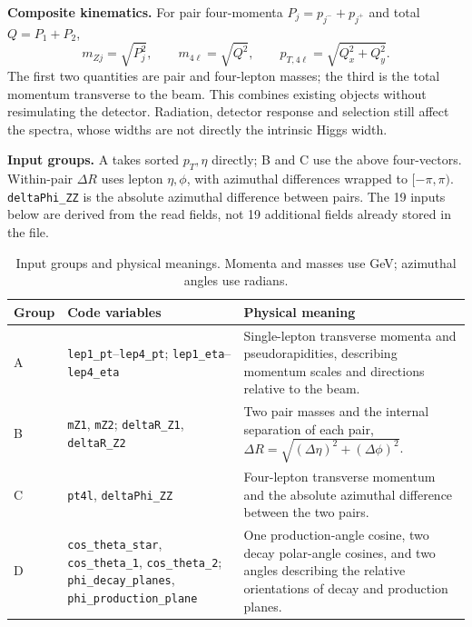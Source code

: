 \documentclass[11pt,a4paper]{article}
\begin{document}
\textbf{Composite kinematics.}
For pair four-momenta $P_j=p_{j^-}+p_{j^+}$ and total $Q=P_1+P_2$,
\[
 m_{Zj}=\sqrt{P_j^2},\qquad m_{4\ell}=\sqrt{Q^2},\qquad
 p_{T,4\ell}=\sqrt{Q_x^2+Q_y^2}.
\]
The first two quantities are pair and four-lepton masses; the third is the total momentum transverse to the beam.
This combines existing objects without resimulating the detector.
Radiation, detector response and selection still affect the spectra, whose widths are not directly the intrinsic Higgs width.

\textbf{Input groups.}
A takes sorted $p_T,\eta$ directly; B and C use the above four-vectors.
Within-pair $\Delta R$ uses lepton $\eta,\phi$, with azimuthal differences wrapped to $[-\pi,\pi)$.
\texttt{deltaPhi\_ZZ} is the absolute azimuthal difference between pairs.
The 19 inputs below are derived from the read fields, not 19 additional fields already stored in the file.

\begin{table}[H]
\caption{Input groups and physical meanings. Momenta and masses use GeV; azimuthal angles use radians.}
\label{tab:features}
\centering\small
\renewcommand{\arraystretch}{1.12}
\begin{tabularx}{\linewidth}{@{}p{.07\linewidth}p{.43\linewidth}Y@{}}
\toprule
Group & Code variables & Physical meaning \\
\midrule
A & \texttt{lep1\_pt}--\texttt{lep4\_pt}; \texttt{lep1\_eta}--\texttt{lep4\_eta} &
Single-lepton transverse momenta and pseudorapidities, describing momentum scales and directions relative to the beam. \\
B & \texttt{mZ1}, \texttt{mZ2}; \texttt{deltaR\_Z1}, \texttt{deltaR\_Z2} &
Two pair masses and the internal separation of each pair, $\Delta R=\sqrt{(\Delta\eta)^2+(\Delta\phi)^2}$. \\
C & \texttt{pt4l}, \texttt{deltaPhi\_ZZ} &
Four-lepton transverse momentum and the absolute azimuthal difference between the two pairs. \\
D & \texttt{cos\_theta\_star}, \texttt{cos\_theta\_1}, \texttt{cos\_theta\_2};
\texttt{phi\_decay\_planes}, \texttt{phi\_production\_plane} &
One production-angle cosine, two decay polar-angle cosines, and two angles describing the relative orientations of decay and production planes. \\
\bottomrule
\end{tabularx}
\end{table}
\end{document}
